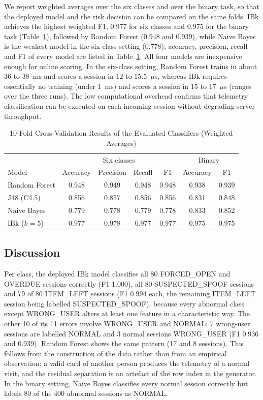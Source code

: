 We report weighted averages over the six classes and over the binary task, so that the deployed model and the risk
decision can be compared on the same folds. IBk achieves the highest weighted F1, 0.977 for six classes and 0.975 for
the binary task (Table~\ref{tab:ml}), followed by Random Forest (0.948 and 0.939), while Naive Bayes is the weakest model in the six-class setting (0.778); accuracy, precision, recall and F1 of every model are listed in Table~\ref{tab:ml}. All four models are inexpensive enough for online scoring. In the six-class
setting, Random Forest trains in about 36 to 38~ms and scores a session in 12 to 15.5~$\mu$s, whereas IBk requires
essentially no training (under 1~ms) and scores a session in 15 to 17~$\mu$s (ranges over the three runs). The low
computational overhead confirms that telemetry classification can be executed on each incoming session without
degrading server throughput.

\begin{table}[!htbp]\renewcommand{\arraystretch}{0.88}
\renewcommand{\arraystretch}{1.0}
\centering
\small
\caption{10-Fold Cross-Validation Results of the Evaluated Classifiers (Weighted Averages)}
\label{tab:ml}
\footnotesize
\begin{tabular}{l c c c c c c}
\hline
 & \multicolumn{4}{c}{Six classes} & \multicolumn{2}{c}{Binary} \\
Model & Accuracy & Precision & Recall & F1 & Accuracy & F1 \\
\hline
Random Forest & 0.948 & 0.949 & 0.948 & 0.948 & 0.938 & 0.939 \\
J48 (C4.5)    & 0.856 & 0.857 & 0.856 & 0.856 & 0.831 & 0.848 \\
Naive Bayes   & 0.779 & 0.778 & 0.779 & 0.778 & 0.833 & 0.852 \\
IBk ($k=5$)   & 0.977 & 0.978 & 0.977 & 0.977 & 0.975 & 0.975 \\
\hline
\end{tabular}
\end{table}

\subsection{Discussion}

Per class, the deployed IBk model classifies all 80 FORCED\_OPEN and OVERDUE sessions correctly (F1 1.000), all 80
SUSPECTED\_SPOOF sessions and 79 of 80 ITEM\_LEFT sessions (F1 0.994 each, the remaining ITEM\_LEFT session being
labelled SUSPECTED\_SPOOF), because every abnormal class except WRONG\_USER alters at least one feature in a
characteristic way. The other 10 of its 11 errors involve WRONG\_USER and NORMAL: 7 wrong-user sessions are labelled
NORMAL and 3 normal sessions WRONG\_USER (F1 0.936 and 0.939). Random Forest shows the same
pattern (17 and 8 sessions). This follows from the construction of the data rather than from an empirical observation:
a valid card of another person produces the telemetry of a normal visit, and the residual separation is an artefact of
the row index in the generator. In the binary setting, Naive Bayes classifies every normal session correctly but
labels 80 of the 400 abnormal sessions as NORMAL.

